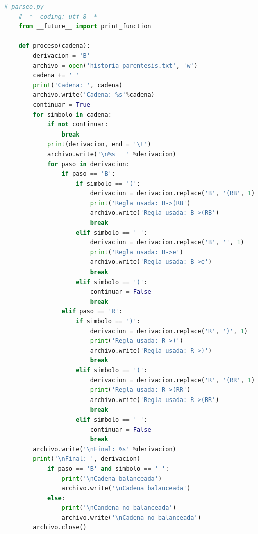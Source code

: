 	\begin{lstlisting}[language=Python]
	# parseo.py
	# -*- coding: utf-8 -*-
	from __future__ import print_function

	def proceso(cadena):
	    derivacion = 'B'
	    archivo = open('historia-parentesis.txt', 'w')
	    cadena += ' '
	    print('Cadena: ', cadena)
	    archivo.write('Cadena: %s'%cadena)
	    continuar = True
	    for simbolo in cadena:
	        if not continuar:
	            break
	        print(derivacion, end = '\t')
	        archivo.write('\n%s   ' %derivacion)
	        for paso in derivacion:
	            if paso == 'B':
	                if simbolo == '(':
	                    derivacion = derivacion.replace('B', '(RB', 1)
	                    print('Regla usada: B->(RB')
	                    archivo.write('Regla usada: B->(RB')
	                    break
	                elif simbolo == ' ':
	                    derivacion = derivacion.replace('B', '', 1)
	                    print('Regla usada: B->e')
	                    archivo.write('Regla usada: B->e')
	                    break
	                elif simbolo == ')':
	                    continuar = False
	                    break
	            elif paso == 'R':
	                if simbolo == ')':
	                    derivacion = derivacion.replace('R', ')', 1)
	                    print('Regla usada: R->)')
	                    archivo.write('Regla usada: R->)')
	                    break
	                elif simbolo == '(':
	                    derivacion = derivacion.replace('R', '(RR', 1)
	                    print('Regla usada: R->(RR')
	                    archivo.write('Regla usada: R->(RR')
	                    break
	                elif simbolo == ' ':
	                    continuar = False
	                    break
	    archivo.write('\nFinal: %s' %derivacion)
	    print('\nFinal: ', derivacion)
			if paso == 'B' and simbolo == ' ':
		        print('\nCadena balanceada')
		        archivo.write('\nCadena balanceada')
		    else:
		        print('\nCandena no balanceada')
		        archivo.write('\nCadena no balanceada')
	    archivo.close()
	\end{lstlisting}
